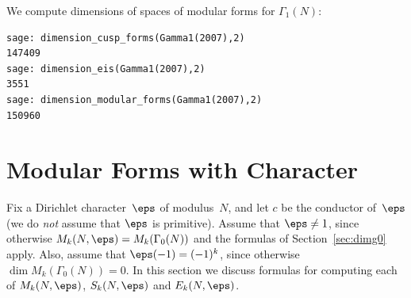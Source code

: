 \begin{example}
We compute dimensions of
spaces of modular forms for $\Gamma_1(N)$:
\begin{verbatim}
sage: dimension_cusp_forms(Gamma1(2007),2)
147409
sage: dimension_eis(Gamma1(2007),2)
3551
sage: dimension_modular_forms(Gamma1(2007),2)
150960
\end{verbatim}
\end{example}

\section{Modular Forms with Character}
Fix a Dirichlet character~$\eps$ of modulus~$N$,
and let $c$ be the conductor of~$\eps$ (we do {\em not}
assume that $\eps$ is primitive).
 Assume that $\eps \neq 1$, since otherwise
$M_k(N,\eps) = M_k(\Gamma_0(N))$ and the formulas of
Section~\ref{sec:dimg0} apply.  Also, assume that $\eps(-1)=(-1)^k$,
since otherwise $\dim M_k(\Gamma_0(N)) = 0$.  In this section we
discuss formulas for computing each of $M_k(N,\eps)$, $S_k(N,\eps)$
and $E_k(N,\eps)$.

